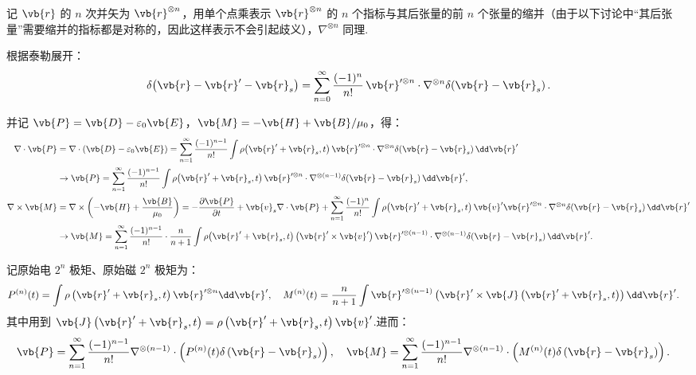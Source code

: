 记 \(\vb{r}\) 的 \(n\) 次并矢为 \(\vb{r}^{\otimes n}\)，用单个点乘表示 \(\vb{r}^{\otimes n}\) 的 \(n\) 个指标与其后张量的前 \(n\) 个张量的缩并（由于以下讨论中“其后张量”需要缩并的指标都是对称的，因此这样表示不会引起歧义），\(\nabla^{\otimes n}\) 同理.

根据泰勒展开：
\begin{align*}
	\delta\!\left( \vb{r} - \vb{r}' - \vb{r}_s \right)
	= \sum_{n=0}^{\infty} \frac{(-1)^n}{n!}\,
	\vb{r}'^{\otimes n} \cdot \nabla^{\otimes n} \delta\!\left( \vb{r} - \vb{r}_s \right).
\end{align*}

并记 \(\vb{P} = \vb{D} - \varepsilon_0 \vb{E}\)，\(\vb{M} = -\vb{H} + \vb{B}/\mu_0\)，得：
\begin{align*}
	\nabla \cdot \vb{P}
	&= \nabla \cdot \left( \vb{D} - \varepsilon_0 \vb{E} \right)
	= \sum_{n=1}^{\infty} \frac{(-1)^{n-1}}{n!}
	\int \rho\!\left( \vb{r}' + \vb{r}_s, t \right)
	\vb{r}'^{\otimes n} \cdot \nabla^{\otimes n}
	\delta\!\left( \vb{r} - \vb{r}_s \right) \dd \vb{r}' \\
	&\to \vb{P}
	= \sum_{n=1}^{\infty} \frac{(-1)^{n-1}}{n!}
	\int \rho\!\left( \vb{r}' + \vb{r}_s, t \right)
	\vb{r}'^{\otimes n} \cdot \nabla^{\otimes (n-1)}
	\delta\!\left( \vb{r} - \vb{r}_s \right) \dd \vb{r}', \\
	\nabla \times \vb{M}
	&= \nabla \times \left( -\vb{H} + \frac{\vb{B}}{\mu_0} \right)
	= -\frac{\partial \vb{P}}{\partial t} + \vb{v}_s \nabla \cdot \vb{P}
	+ \sum_{n=1}^{\infty} \frac{(-1)^n}{n!}
	\int \rho\!\left( \vb{r}' + \vb{r}_s, t \right)
	\vb{v}' \vb{r}'^{\otimes n} \cdot \nabla^{\otimes n}
	\delta\!\left( \vb{r} - \vb{r}_s \right) \dd \vb{r}' \\
	&\to \vb{M}
	= \sum_{n=1}^{\infty} \frac{(-1)^{n-1}}{n!} \cdot \frac{n}{n+1}
	\int \rho\!\left( \vb{r}' + \vb{r}_s, t \right)
	\left( \vb{r}' \times \vb{v}' \right)
	\vb{r}'^{\otimes (n-1)} \cdot \nabla^{\otimes (n-1)}
	\delta\!\left( \vb{r} - \vb{r}_s \right) \dd \vb{r}'.
\end{align*}

记原始电 \(2^n\) 极矩、原始磁 \(2^n\) 极矩为：
\begin{align*}
	P^{(n)}(t) &= \int \rho\left( \vb{r}' + \vb{r}_s, t \right) \vb{r}'^{\otimes n} \dd \vb{r}', \quad
	M^{(n)}(t) = \frac{n}{n+1} \int \vb{r}'^{\otimes (n-1)} \left( \vb{r}' \times \vb{J}\left( \vb{r}' + \vb{r}_s, t \right) \right) \dd \vb{r}'.
\end{align*}
其中用到 \(\vb{J}\left( \vb{r}' + \vb{r}_s, t \right) = \rho\left( \vb{r}' + \vb{r}_s, t \right) \vb{v}'\).进而：
\begin{align*}
	\vb{P} &= \sum_{n=1}^{\infty} \frac{(-1)^{n-1}}{n!} \nabla^{\otimes (n-1)} \cdot \left( P^{(n)}(t) \delta\left( \vb{r} - \vb{r}_s \right) \right), \quad
	\vb{M} = \sum_{n=1}^{\infty} \frac{(-1)^{n-1}}{n!} \nabla^{\otimes (n-1)} \cdot \left( M^{(n)}(t) \delta\left( \vb{r} - \vb{r}_s \right) \right).
\end{align*}

